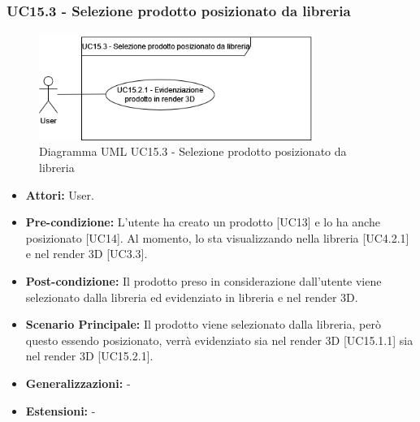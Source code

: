 \subsubsection{UC15.3 - Selezione prodotto posizionato da libreria}
\begin{figure}[H]
  \centering
  \includegraphics[width=0.8\textwidth]{UC_diagrams_11-20/UC15.3.drawio.png}
   \caption{Diagramma UML UC15.3 - Selezione prodotto posizionato da libreria}
\end{figure}
\begin{itemize}
    \item \textbf{Attori:} User.
    \item \textbf{Pre-condizione:} L'utente ha creato un prodotto [UC13] e lo ha anche posizionato [UC14]. Al momento, lo sta visualizzando nella libreria [UC4.2.1] e nel render 3D [UC3.3].
    \item \textbf{Post-condizione:} Il prodotto preso in considerazione dall'utente viene selezionato dalla libreria ed evidenziato in libreria e nel render 3D.
    \item \textbf{Scenario Principale:} Il prodotto viene selezionato dalla libreria, però questo essendo posizionato, verrà evidenziato sia nel render 3D [UC15.1.1] sia nel render 3D [UC15.2.1].
    \item \textbf{Generalizzazioni:} -
    \item \textbf{Estensioni:} -
\end{itemize}

